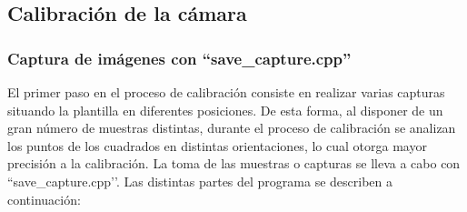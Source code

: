 \subsection{Calibración de la cámara} \label{s3_2_2}

\subsubsection{Captura de imágenes con ``save\_capture.cpp''}\label{s3_2_2_1}

El primer paso en el proceso de calibración consiste en realizar varias capturas situando la plantilla en diferentes posiciones. De esta forma, al disponer de un gran número de muestras distintas, durante el proceso de calibración se analizan los puntos de los cuadrados en distintas orientaciones, lo cual otorga mayor precisión a la calibración.
La toma de las muestras o capturas se lleva a cabo con ``save\_capture.cpp’’. Las distintas partes del programa se describen a continuación:


